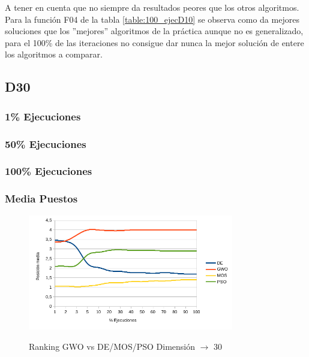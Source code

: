 \documentclass[a4paper]{report}
\begin{document}
A tener en cuenta que no siempre da resultados peores que los otros algoritmos. Para la función F04 de la tabla \ref{table:100_ejecD10} se observa como da mejores soluciones que los ''mejores'' algoritmos de la práctica aunque no es generalizado, para el 100\% de las iteraciones no consigue dar nunca la mejor solución de entere los algoritmos a comparar.




\subsection{D30}

\subsubsection*{1\% Ejecuciones}


\subsubsection*{50\% Ejecuciones}


\subsubsection*{100\% Ejecuciones}


\subsubsection*{Media Puestos}

\begin{figure}[H]
    \caption{Ranking GWO vs DE/MOS/PSO Dimensión $\rightarrow$ 30}
    \centering
    \includegraphics[width=0.8\textwidth]{Resultados/basico/d30/Grafico_puestos.png} \label{img:ranking_D30}
\end{figure}
\end{document}
